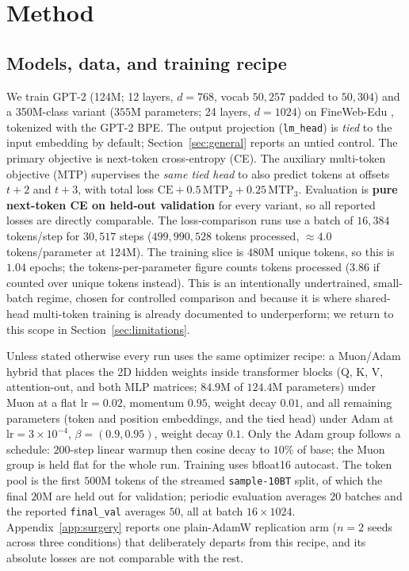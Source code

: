 \section{Method}
\label{sec:method}

\subsection{Models, data, and training recipe}
We train GPT-2 \citep{radford2019gpt2} (124M; 12 layers, $d{=}768$, vocab
$50{,}257$ padded to $50{,}304$) and a 350M-class variant ($355$M parameters; 24 layers, $d{=}1024$) on
FineWeb-Edu \citep{penedo2024fineweb}, tokenized with the GPT-2 BPE. The output projection (\texttt{lm\_head}) is \emph{tied} to the input
embedding by default; Section~\ref{sec:general} reports an untied control. The
primary objective is next-token cross-entropy (CE). The auxiliary multi-token
objective (MTP) supervises the \emph{same tied head} to also predict tokens at
offsets $t{+}2$ and $t{+}3$, with total loss
$\mathrm{CE} + 0.5\,\mathrm{MTP}_2 + 0.25\,\mathrm{MTP}_3$. Evaluation is
\textbf{pure next-token CE on held-out validation} for every variant, so all
reported losses are directly comparable. The loss-comparison runs use a batch of
$16{,}384$ tokens/step for $30{,}517$ steps ($499{,}990{,}528$ tokens processed,
$\approx 4.0$ tokens/parameter at 124M). The training slice is $480$M unique tokens,
so this is $1.04$ epochs; the tokens-per-parameter figure counts tokens processed
($3.86$ if counted over unique tokens instead). This is an intentionally undertrained,
small-batch regime, chosen for controlled comparison and because it is where
shared-head multi-token training is already documented to underperform; we return to this scope in Section~\ref{sec:limitations}.

Unless stated otherwise every run uses the same optimizer recipe: a Muon/Adam hybrid
\citep{jordan2024muon}
that places the 2D hidden weights inside transformer blocks (Q, K, V, attention-out,
and both MLP matrices; $84.9$M of $124.4$M parameters) under Muon at a flat
$\mathrm{lr}{=}0.02$, momentum $0.95$, weight decay $0.01$, and all remaining
parameters (token and position embeddings, and the tied head) under Adam at
$\mathrm{lr}{=}3\times 10^{-4}$, $\beta{=}(0.9,0.95)$, weight decay $0.1$. Only the
Adam group follows a schedule: $200$-step linear warmup then cosine decay to $10\%$
of base; the Muon group is held flat for the whole run. Training uses bfloat16
autocast. The token pool is the first $500$M tokens of the streamed
\texttt{sample-10BT} split, of which the final $20$M are held out for validation;
periodic evaluation averages $20$ batches and the reported \texttt{final\_val}
averages $50$, all at batch $16 \times 1024$. Appendix~\ref{app:surgery} reports one
plain-AdamW replication arm ($n{=}2$ seeds across three conditions) that deliberately
departs from this recipe, and its absolute losses are not comparable with the rest.

